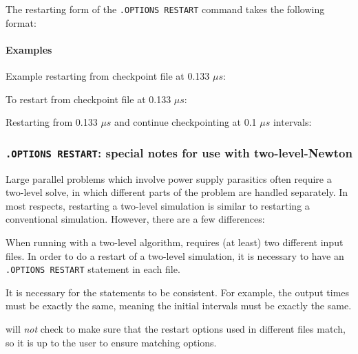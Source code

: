 {{The restarting form of the \texttt{.OPTIONS RESTART} command takes the following format:


\paragraph{Examples}

Example restarting from checkpoint file at 0.133 $\mu s$:

To restart from checkpoint file at 0.133 $\mu s$:

Restarting from 0.133 $\mu s$ and continue checkpointing at 0.1 $\mu s$
intervals:

\subsubsection{\texttt{.OPTIONS RESTART}: special notes for use with two-level-Newton}

Large parallel problems which involve power supply parasitics often
require a two-level solve, in which different parts of the problem
are handled separately.  In most respects, restarting a two-level
simulation is similar to restarting a conventional simulation.
However, there are a few differences:

\begin{XyceItemize}
\item When running with a two-level algorithm, \Xyce{} requires (at least) two
different input files.  In order to do a restart of a two-level \Xyce{}
simulation, it is necessary to have an \texttt{.OPTIONS RESTART} statement
in each file.

\item It is necessary for the statements to be consistent.  For example,
the output times must be exactly the same, meaning the initial intervals
must be exactly the same.

\item \Xyce{} will \emph{not} check to make sure that the restart
options used in different files match, so it is up to the user to ensure
matching options.


\end{XyceItemize}}}
